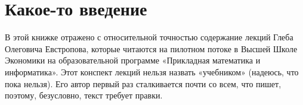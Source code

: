 \section{Какое-то введение}

В этой книжке отражено с относительной точностью содержание лекций Глеба Олеговича Евстропова, которые читаются на пилотном потоке в Высшей Школе Экономики на образовательной программе «Прикладная математика и информатика». Этот конспект лекций нельзя назвать «учебником» (надеюсь, что пока нельзя). Его автор первый раз сталкивается почти со всем, что пишет, поэтому, безусловно, текст требует правки.